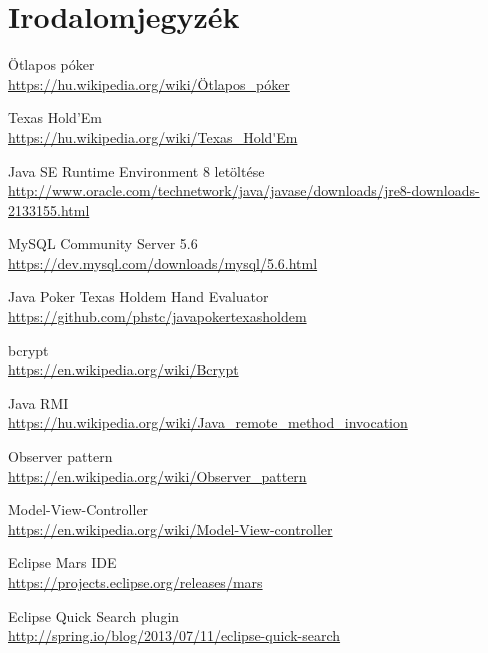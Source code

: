 \part{Irodalomjegyzék}

\begin{thebibliography}{9}

Ötlapos póker \\
\url{https://hu.wikipedia.org/wiki/Ötlapos_póker}

Texas Hold'Em \\
\url{https://hu.wikipedia.org/wiki/Texas_Hold'Em}

Java SE Runtime Environment 8 letöltése \\
\url{http://www.oracle.com/technetwork/java/javase/downloads/jre8-downloads-2133155.html}

MySQL Community Server 5.6 \\
\url{https://dev.mysql.com/downloads/mysql/5.6.html}

Java Poker Texas Holdem Hand Evaluator \\
\url{https://github.com/phstc/javapokertexasholdem}

bcrypt \\
\url{https://en.wikipedia.org/wiki/Bcrypt}

Java RMI \\
\url{https://hu.wikipedia.org/wiki/Java_remote_method_invocation}

Observer pattern \\
\url{https://en.wikipedia.org/wiki/Observer_pattern}

Model-View-Controller \\
\url{https://en.wikipedia.org/wiki/Model-View-controller}

Eclipse Mars IDE \\
\url{https://projects.eclipse.org/releases/mars}

Eclipse Quick Search plugin \\
\url{http://spring.io/blog/2013/07/11/eclipse-quick-search}

\end{thebibliography}
